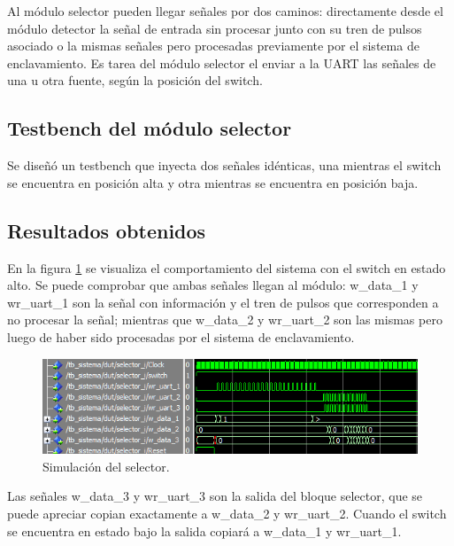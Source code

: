 	Al módulo selector pueden llegar señales por dos caminos: directamente desde el módulo detector la señal de entrada sin procesar junto con su tren de pulsos asociado o la mismas señales pero procesadas previamente por el sistema de enclavamiento. Es tarea del módulo selector el enviar a la UART las señales de una u otra fuente, según la posición del switch.	
	
	\subsection{Testbench del módulo selector}
			
		Se diseñó un testbench que inyecta dos señales idénticas, una mientras el switch se encuentra en posición alta y otra mientras se encuentra en posición baja.		
						
	\subsection{Resultados obtenidos}
				
		En la figura \ref{fig:Test_Selector} se visualiza el comportamiento del sistema con el switch en estado alto. Se puede comprobar que ambas señales llegan al módulo: w\_data\_1 y wr\_uart\_1 son la señal con información y el tren de pulsos que corresponden a no procesar la señal; mientras que w\_data\_2 y wr\_uart\_2 son las mismas pero luego de haber sido procesadas por el sistema de enclavamiento.
			
	\begin{figure}[h]
	\centering
	\includegraphics[scale=0.9]{./Figures/Test/Selector}
		\caption{Simulación del selector.}
		\label{fig:Test_Selector}
	\end{figure}
	
			
	Las señales w\_data\_3 y wr\_uart\_3 son la salida del bloque selector, que se puede apreciar copian exactamente a w\_data\_2 y wr\_uart\_2. Cuando el switch se encuentra en estado bajo la salida copiará a w\_data\_1 y wr\_uart\_1.
